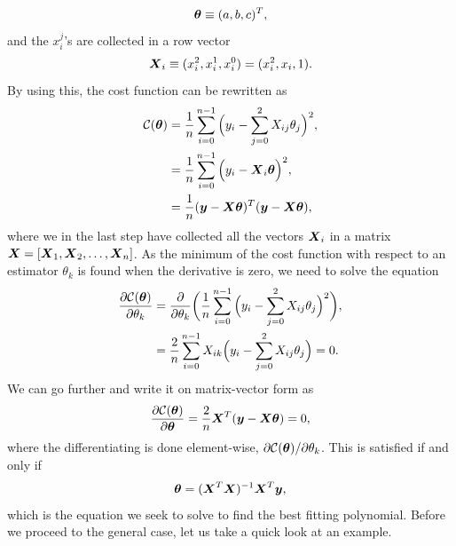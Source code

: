 \begin{equation}
\boldsymbol{{\theta}}\equiv(a,b,c)^T,
\end{equation}
and the $x_i^j$'s are collected in a row vector
\begin{equation}
\boldsymbol{{X}}_i\equiv(x_i^2, x_i^1, x_i^0)=(x_i^2, x_i, 1).
\end{equation}
By using this, the cost function can be rewritten as
\begin{equation}
\begin{aligned}
\mathcal{C}(\boldsymbol{{\theta}})&=\frac{1}{n}\sum_{i=0}^{n-1}\Big(y_i-\sum_{j=0}^2X_{ij}\theta_j\Big)^2,\\
&=\frac{1}{n}\sum_{i=0}^{n-1}\Big(y_i-\boldsymbol{{X}}_i\boldsymbol{{\theta}}\Big)^2,\\
&=\frac{1}{n}(\boldsymbol{{y}}-\boldsymbol{{X}}\boldsymbol{{\theta}})^T(\boldsymbol{{y}}-\boldsymbol{{X}}\boldsymbol{{\theta}}),
\end{aligned}
\label{eq:polynomialcost}
\end{equation}
where we in the last step have collected all the vectors $\boldsymbol{{X}}_i$ in a matrix $\boldsymbol{{X}}=[\boldsymbol{{X}}_1,\boldsymbol{{X}}_2,\hdots,\boldsymbol{{X}}_n]$. As the minimum of the cost function with respect to an estimator $\theta_k$ is found when the derivative is zero, we need to solve the equation
\begin{equation}
\begin{aligned}
\frac{\partial \mathcal{C}(\boldsymbol{{\theta}})}{\partial\theta_k} &=\frac{\partial}{\partial\theta_k}\bigg(\frac{1}{n}\sum_{i=0}^{n-1}\Big(y_i-\sum_{j=0}^2X_{ij}\theta_j\Big)^2\bigg),\\
&=\frac{2}{n}\sum_{i=0}^{n-1}X_{ik}\Big(y_i-\sum_{j=0}^2X_{ij}\theta_j\Big)=0.
\end{aligned}
\end{equation}
We can go further and write it on matrix-vector form as
\begin{equation}
\frac{\partial \mathcal{C}(\boldsymbol{{\theta}})}{\partial\boldsymbol{{\theta}}}=\frac{2}{n}\boldsymbol{{X}}^T(\boldsymbol{{y}}-\boldsymbol{{X}}\boldsymbol{{\theta}})=0,
\end{equation}
where the differentiating is done element-wise, $\partial\mathcal{C(\boldsymbol{{\theta}})}/\partial\theta_k$. This is satisfied if and only if
\begin{equation}
\boldsymbol{{\theta}}=(\boldsymbol{{X}}^T\boldsymbol{{X}})^{-1}\boldsymbol{{X}}^T\boldsymbol{{y}},
\label{eq:polynomialestimators}
\end{equation}
which is the equation we seek to solve to find the best fitting polynomial. Before we proceed to the general case, let us take a quick look at an example.

